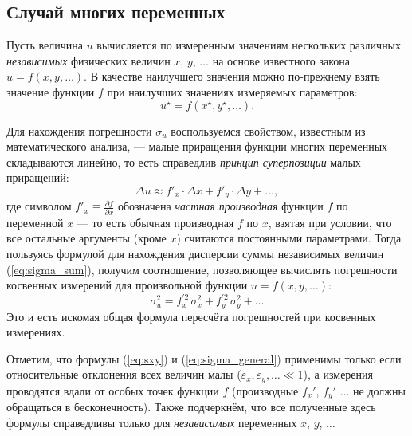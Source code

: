 

\subsection{Случай многих переменных}

Пусть величина $u$ вычисляется по измеренным значениям нескольких
различных \emph{независимых} физических величин $x$, $y$, $\ldots$
на основе известного закона $u=f\!\left(x,y,\ldots\right)$. В качестве
наилучшего значения можно по-прежнему взять значение функции $f$
при наилучших значениях измеряемых параметров:
\[
u^{\star}=f\!\left(x^{\star},y^{\star},\ldots\right).
\]

Для нахождения погрешности $\sigma_{u}$ воспользуемся свойством,
известным из математического анализа, --- малые приращения
функции многих переменных складываются линейно, то есть справедлив
\emph{принцип суперпозиции} малых приращений:
\[
\Delta u\approx f'_{x}\cdot\Delta x+f'_{y}\cdot\Delta y+\ldots,
\]
где символом $f'_{x}\equiv\frac{\partial f}{\partial x}$ обозначена
\emph{частная производная} функции $f$ по переменной $x$ ---
то есть обычная производная $f$ по $x$, взятая при условии, что
все остальные аргументы (кроме $x$) считаются постоянными параметрами.
Тогда пользуясь формулой для нахождения дисперсии суммы независимых
величин (\ref{eq:sigma_sum}), получим соотношение, позволяющее вычислять
погрешности косвенных измерений для произвольной функции $u=f\left(x,y,\ldots\right)$:
\begin{equation}
\boxed{\sigma_{u}^{2}=f_{x}^{\prime2}\,\sigma_{x}^{2}+f_{y}^{\prime2}\,\sigma_{y}^{2}+\ldots}\label{eq:sigma_general}
\end{equation}
Это и есть искомая общая формула пересчёта погрешностей при косвенных
измерениях.

Отметим, что формулы (\ref{eq:sxy}) и (\ref{eq:sigma_general}) применимы
только если относительные отклонения всех величин малы ($\varepsilon_{x},\varepsilon_{y},\ldots\ll1$),
а измерения проводятся вдали от особых точек функции $f$ (производные
$f_{x}'$, $f_{y}'$ $\ldots$ не должны обращаться в бесконечность).
Также подчеркнём, что все полученные здесь формулы справедливы только
для \emph{независимых} переменных $x$, $y$, $\ldots$

